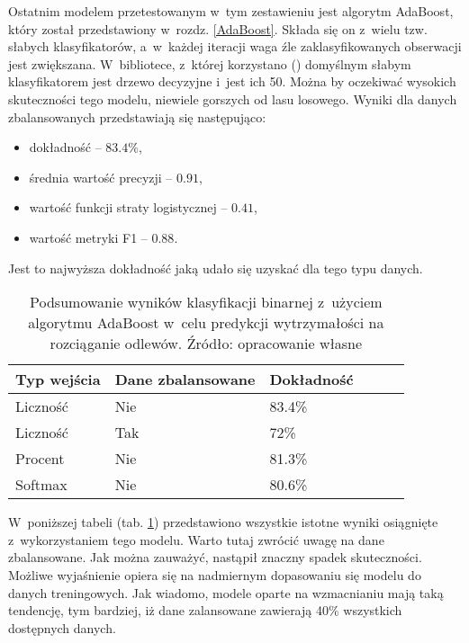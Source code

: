 Ostatnim modelem przetestowanym w~tym zestawieniu jest algorytm AdaBoost, który został przedstawiony w~rozdz. \ref{AdaBoost}. Składa się on z~wielu tzw. słabych klasyfikatorów, a~w~każdej iteracji waga źle zaklasyfikowanych obserwacji jest zwiększana. W~bibliotece, z~której korzystano () domyślnym słabym klasyfikatorem jest drzewo decyzyjne i~jest ich 50. Można by oczekiwać wysokich skuteczności tego modelu, niewiele gorszych od lasu losowego. 
Wyniki dla danych zbalansowanych przedstawiają się następująco:
\begin{itemize}
	\item dokładność – $83.4\%$,
	\item średnia wartość precyzji – $0.91$,
	\item wartość funkcji straty logistycznej – $0.41$,
	\item wartość metryki F1 – $0.88$.
\end{itemize}
Jest to najwyższa dokładność jaką udało się uzyskać dla tego typu danych.
\begin{table}[h]
	\centering
	\begin{threeparttable}
		\caption{Podsumowanie wyników klasyfikacji binarnej z~użyciem algorytmu AdaBoost w~celu predykcji wytrzymałości na rozciąganie odlewów. Źródło: opracowanie własne}
		\label{ada.summary.table}
		\begin{tabularx}{1\textwidth}{ |X|X|X|X|X|X| }
		  \hline
		  \textbf{Typ wejścia} & \textbf{Dane zbalansowane} & \textbf{Dokładność}  \\
		  \hline

	          Liczność & Nie & 83.4\%\\
		  \hline

	          Liczność & Tak & 72\%\\
		  \hline

	          Procent & Nie & 81.3\%\\
		  \hline

	          Softmax & Nie & 80.6\%\\
		  \hline
		\end{tabularx}
	\end{threeparttable}
\end{table}
W~poniższej tabeli (tab. \ref{ada.summary.table}) przedstawiono wszystkie istotne wyniki osiągnięte z~wykorzystaniem tego modelu.
Warto tutaj zwrócić uwagę na dane zbalansowane. Jak można zauważyć, nastąpił znaczny spadek skuteczności. Możliwe wyjaśnienie opiera się na nadmiernym dopasowaniu się modelu do danych treningowych. Jak wiadomo, modele oparte na wzmacnianiu mają taką tendencję, tym bardziej, iż dane zalansowane zawierają 40\% wszystkich dostępnych danych.

